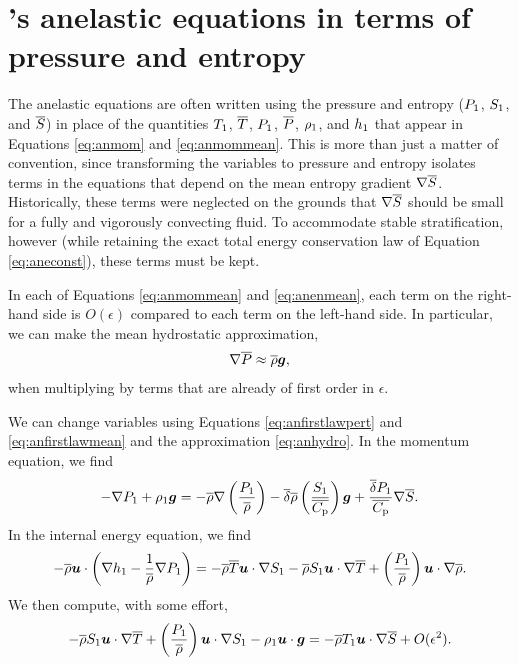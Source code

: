 \documentclass[12pt]{article}
\begin{document}
\section{\citet{Gough1969}'s anelastic equations in terms of pressure and entropy}\label{sec:goughprsentr}
The anelastic equations are often written using the pressure and entropy ($P_1$, $S_1$, and $\overline{S}$) in place of the quantities $T_1$, $\overline{T}$, $P_1$, $\overline{P}$, $\rho_1$, and $h_1$ that appear in Equations \eqref{eq:anmom} and \eqref{eq:anmommean}. This is more than just a matter of convention, since transforming the variables to pressure and entropy isolates terms in the equations that depend on the mean entropy gradient $\nabla\overline{S}$. Historically, these terms were neglected on the grounds that $\nabla\overline{S}$ should be small for a fully and vigorously convecting fluid. To accommodate stable stratification, however (while retaining the exact total energy conservation law of Equation \eqref{eq:aneconst}), these terms must be kept. 

  In each of Equations \eqref{eq:anmommean} and \eqref{eq:anenmean}, each term on the right-hand side is $O(\epsilon)$ compared to each term on the left-hand side. In particular, we can make the mean hydrostatic approximation, 
\begin{align}\label{eq:anhydro}
	\nabla\overline{P}\approx \overline{\rho}\bm{g},
\end{align}
when multiplying by terms that are already of first order in $\epsilon$. 

We can change variables using Equations \eqref{eq:anfirstlawpert} and \eqref{eq:anfirstlawmean} and the approximation \eqref{eq:anhydro}. In the momentum equation, we find
\begin{align}\label{eq:anmomrhs}
	-\nabla P_1 + \rho_1\bm{g} = -\overline{\rho}\nabla\left(\frac{P_1}{\overline{\rho}}\right) - \overline{\delta} \overline{\rho} \left(\frac{S_1}{\overline{C_{\rm{p}}}}\right) \bm{g} + \frac{\overline{\delta}P_1}{\overline{C_{\rm{p}}}}\nabla\overline{S}.
\end{align}
In the internal energy equation, we find
\begin{align}\label{eq:anenrhs}
	-\overline{\rho}\bm{u}\cdot\left(\nabla h_1-\frac{1}{\overline{\rho}}\nabla P_1\right) = -\overline{\rho}\overline{T}\bm{u}\cdot\nabla S_1 - \overline{\rho} S_1\bm{u}\cdot\nabla\overline{T} + \left(\frac{P_1}{\overline{\rho}}\right)\bm{u}\cdot\nabla \overline{\rho}.
\end{align}
We then compute, with some effort,
\begin{align}\label{eq:anenrhs2}
	- \overline{\rho} S_1\bm{u}\cdot\nabla\overline{T} + \left(\frac{P_1}{\overline{\rho}}\right)\bm{u}\cdot\nabla S_1 -\rho_1\bm{u}\cdot\bm{g} = -\overline{\rho} T_1\bm{u}\cdot\nabla\overline{S} + O(\epsilon^2).
\end{align}
\end{document}

